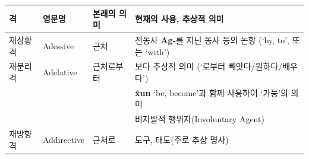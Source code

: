 \begin{table}[H]
\begin{center}
\begin{tabular}{llll}
\hline
격		&영문명		&본래의 의미	&현재의 사용, 추상적 의미\\
\hline
재상황격	&Adessive	&근처		&전동사 \textbf{Ag-}를 지닌 동사 등의 논항 (`by, to', 또는 `with')\\
재분리격	&Adelative	&근처로부터&보다 추상적 의미 (`로부터 빼앗다/원하다/배우다')\\
&&&\textbf{\^xun} `be, become'과 함께 사용하여 `가능'의 의미\\
&&&비자발적 행위자(Involuntary Agent)\\
재방향격	&Addirective	&근처로&도구, 태도(주로 추상 명사)\\

\hline
\end{tabular}
\end{center}
\end{table}

\pagebreak


